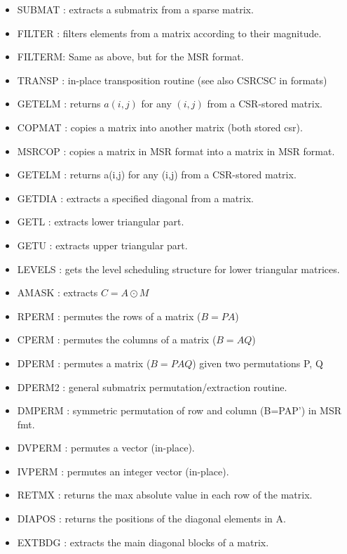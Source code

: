 \documentclass[12pt]{article}
\begin{document}
\begin{itemize} 

\item SUBMAT : extracts a submatrix from a sparse matrix.                  
\item FILTER : filters elements from a matrix according to their magnitude.
\item FILTERM: Same as above, but for the MSR format.
\item TRANSP : in-place transposition routine (see also CSRCSC in formats) 
\item GETELM : returns $a(i,j)$ for any $(i,j)$	 from a CSR-stored matrix.
\item COPMAT : copies a matrix into another matrix (both stored csr).
\item MSRCOP : copies a matrix in MSR format into a matrix in MSR format.
\item GETELM : returns a(i,j) for any (i,j) from a CSR-stored matrix.
\item GETDIA : extracts a specified diagonal from a matrix.                
\item GETL   : extracts lower triangular part.
\item GETU   : extracts upper triangular part.                             
\item LEVELS : gets the level scheduling structure for lower triangular    
 matrices.                                                   
\item AMASK  : extracts  $C = A \odot  M $
\item RPERM  : permutes the rows of a matrix ($B = P A$)                     
\item CPERM  : permutes the columns of a matrix ($B = A Q$)                  
\item DPERM  : permutes a matrix ($B = P A Q$) given two permutations P, Q   
\item DPERM2 : general submatrix permutation/extraction routine.
\item DMPERM : symmetric permutation of row and column (B=PAP') in MSR fmt.
\item DVPERM : permutes a vector (in-place).                                
\item IVPERM : permutes an integer vector (in-place).
\item RETMX  : returns the max absolute value in each row of the matrix.
\item DIAPOS : returns the positions of the diagonal elements in A.
\item EXTBDG : extracts the main diagonal blocks of a matrix.   

\end{itemize}
\end{document}
